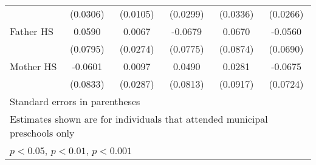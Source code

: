 \begin{table}[htbp]
\begin{tabular}{l*{5}{c}}
            &    (0.0306)         &    (0.0105)         &    (0.0299)         &    (0.0336)         &    (0.0266)         \\
\addlinespace
Father HS   &      0.0590         &      0.0067         &     -0.0679         &      0.0670         &     -0.0560         \\
            &    (0.0795)         &    (0.0274)         &    (0.0775)         &    (0.0874)         &    (0.0690)         \\
\addlinespace
Mother HS   &     -0.0601         &      0.0097         &      0.0490         &      0.0281         &     -0.0675         \\
            &    (0.0833)         &    (0.0287)         &    (0.0813)         &    (0.0917)         &    (0.0724)         \\
\bottomrule
\multicolumn{6}{l}{\footnotesize Standard errors in parentheses}\\
\multicolumn{6}{l}{\footnotesize Estimates shown are for individuals that attended municipal preschools only}\\
\multicolumn{6}{l}{\footnotesize \sym{*} \(p<0.05\), \sym{**} \(p<0.01\), \sym{***} \(p<0.001\)}\\
\end{tabular}
\end{table}
